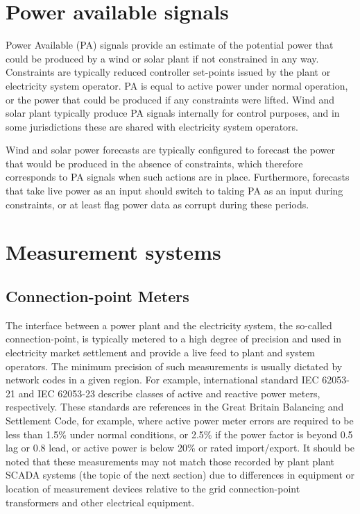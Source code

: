 \section{Power available signals}
\label{sec:power_available}

Power Available (PA) signals provide an estimate of the potential power that could be produced by a wind or solar plant if not constrained in any way. Constraints are typically reduced controller set-points issued by the plant or electricity system operator. PA is equal to active power under normal operation, or the power that could be produced if any constraints were lifted. Wind and solar plant typically produce PA signals internally for control purposes, and in some jurisdictions these are shared with electricity system operators.

Wind and solar power forecasts are typically configured to forecast the power that would be produced in the absence of constraints, which therefore corresponds to PA signals when such actions are in place. Furthermore, forecasts that take live power as an input should switch to taking PA as an input during constraints, or at least flag power data as corrupt during these periods.

\section{Measurement systems}

\subsection{Connection-point Meters}

The interface between a power plant and the electricity system, the so-called connection-point, is typically metered to a high degree of precision and used in electricity market settlement and provide a live feed to plant and system operators. The minimum precision of such measurements is usually dictated by network codes in a given region. For example, international standard IEC 62053-21 and IEC 62053-23 describe classes of active and reactive power meters, respectively. These standards are references in the Great Britain Balancing and Settlement Code, for example, where active power meter errors are required to be less than 1.5\% under normal conditions, or 2.5\% if the power factor is beyond 0.5 lag or 0.8 lead, or active power is below 20\% or rated import/export. It should be noted that these measurements may not match those recorded by plant plant SCADA systems (the topic of the next section) due to differences in equipment or location of measurement devices relative to the grid connection-point transformers and other electrical equipment.


